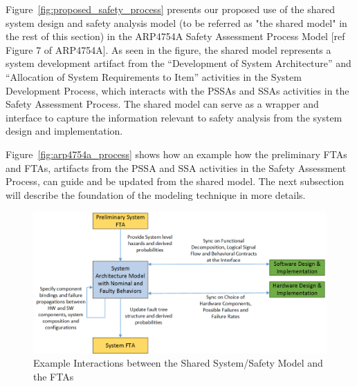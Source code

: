 Figure~\ref{fig:proposed_safety_process} presents our proposed use of the shared system design and safety analysis model (to be referred as "the shared model" in the rest of this section) in the ARP4754A Safety Assessment Process Model [ref Figure 7 of ARP4754A]. As seen in the figure, the shared model represents a system development artifact from the ``Development of System Architecture'' and ``Allocation of System Requirements to Item'' activities in the System Development Process, which interacts with the PSSAs and SSAs activities in the Safety Assessment Process. The shared model can serve as a wrapper and interface to capture the information relevant to safety analysis from the system design and implementation.

Figure~\ref{fig:arp4754a_process} shows how an example how the preliminary FTAs and FTAs, artifacts from the PSSA and SSA activities in the Safety Assessment Process, can guide and be updated from the shared model. The next subsection will describe the foundation of the modeling technique in more details.

\begin{figure}[h!]
	\vspace{-0.19in}
	\begin{center}
		\includegraphics[width=1.0\textwidth]{images/FTA_MBD_Workflow.png}
	\end{center}
	\caption{Example Interactions between the Shared System/Safety Model and  the FTAs}
	\label{fig:interaction_with_FTA}
\end{figure}


